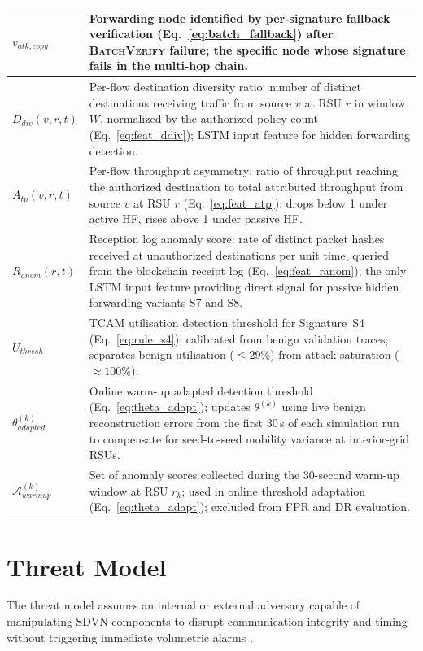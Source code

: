 \documentclass[12pt, a4paper]{report}
\begin{document}
\begin{longtable}{|m{5.0cm}|m{9.0cm}|}
\hline
$v_{atk,copy}$ & Forwarding node identified by per-signature fallback verification (Eq.~\ref{eq:batch_fallback}) after \textsc{BatchVerify} failure; the specific node whose signature fails in the multi-hop chain. \\
\hline
$D_{div}(v,r,t)$ & Per-flow destination diversity ratio: number of distinct destinations receiving traffic from source $v$ at \ac{RSU} $r$ in window $W$, normalized by the authorized policy count (Eq.~\ref{eq:feat_ddiv}); \ac{LSTM} input feature for hidden forwarding detection. \\
\hline
$A_{tp}(v,r,t)$ & Per-flow throughput asymmetry: ratio of throughput reaching the authorized destination to total attributed throughput from source $v$ at \ac{RSU} $r$ (Eq.~\ref{eq:feat_atp}); drops below 1 under active \ac{HF}, rises above 1 under passive \ac{HF}. \\
\hline
$R_{anom}(r,t)$ &
Reception log anomaly score: rate of distinct packet
hashes received at unauthorized destinations per
unit time, queried from the blockchain receipt log
(Eq.~\ref{eq:feat_ranom}); the only \ac{LSTM} input
feature providing direct signal for passive hidden
forwarding variants S7 and S8. \\


\hline
$U_{thresh}$ & TCAM utilisation detection threshold for Signature~S4 (Eq.~\ref{eq:rule_s4}); calibrated from benign validation traces; separates benign utilisation ($\leq 29\%$) from attack saturation ($\approx 100\%$). \\
\hline
$\theta^{(k)}_{adapted}$ &
Online warm-up adapted detection threshold
(Eq.~\ref{eq:theta_adapt}); updates
$\theta^{(k)}$ using live benign reconstruction
errors from the first 30\,s of each simulation
run to compensate for seed-to-seed mobility
variance at interior-grid \ac{RSU}s. \\
\hline
$\mathcal{A}_{warmup}^{(k)}$ &
Set of anomaly scores collected during the
30-second warm-up window at \ac{RSU} $r_k$;
used in online threshold adaptation
(Eq.~\ref{eq:theta_adapt}); excluded from
\ac{FPR} and \ac{DR} evaluation. \\
\hline
\end{longtable}
\endgroup
\section{Threat Model}
\label{sec:threat_model_main}
The threat model assumes an internal or external adversary capable of manipulating SDVN components to disrupt communication integrity and timing without triggering immediate volumetric alarms \cite{PASCOAL2020107223}\cite{DBLP:journals/air/QammarKND23}.
\end{document}
